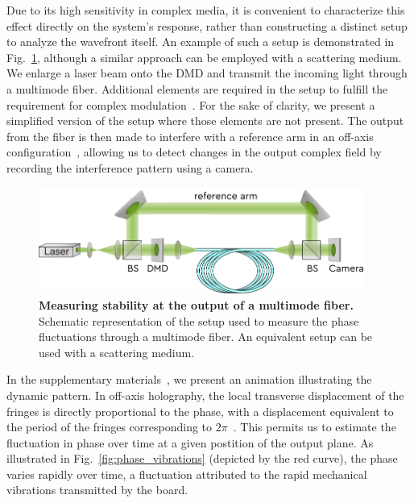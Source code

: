 \documentclass[12pt]{iopart}
\begin{document}
Due to its high sensitivity in complex media,
it is convenient to characterize this effect
directly on the system's response,
rather than constructing a distinct setup to analyze the wavefront itself.
An example of such a setup is demonstrated in Fig.~\ref{fig:MMF_ref},
although a similar approach can be employed with a scattering medium.
We enlarge a laser beam onto the DMD and transmit the incoming light through a multimode fiber.
Additional elements are required in the setup to fulfill the requirement for complex modulation~\cite{Gutierrez2024DMD}.
For the sake of clarity, we present a simplified version of the setup where those elements are not present.
The output from the fiber is then made to interfere with a reference arm
in an off-axis configuration~\cite{Cuche2000spatial},
allowing us to detect changes in the output complex field
by recording the interference pattern using a camera.\\




\begin{figure}[ht]
  \centering
  \includegraphics[width = 0.95\textwidth]{images/MMF_ref.pdf}
  \caption{
    \textbf{Measuring stability at the output of a multimode fiber.}
    Schematic representation of the setup used to measure the phase fluctuations
    through a multimode fiber.
    An equivalent setup can be used with a scattering medium.
  }
  \label{fig:MMF_ref}
\end{figure}

In the supplementary materials~\cite{SI}, we present an animation illustrating the dynamic pattern.
In off-axis holography,
the local transverse displacement of the fringes
is directly proportional to the phase,
with a displacement equivalent to the period of the fringes corresponding to $2\pi$~\cite{Cuche2000spatial}.
This permits us to estimate the fluctuation in phase over time at a given postition of the output plane.
As illustrated in Fig.~\ref{fig:phase_vibrations} (depicted by the red curve),
the phase varies rapidly over time,
a fluctuation attributed to the rapid mechanical vibrations transmitted by the board.\\
\end{document}
